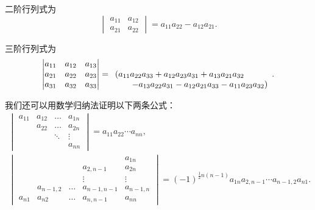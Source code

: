 二阶行列式为
\begin{equation}
	\begin{vmatrix}
		a_{11} & a_{12} \\
		a_{21} & a_{22}
	\end{vmatrix}
	= a_{11} a_{22} - a_{12} a_{21}.
\end{equation}

三阶行列式为
\begin{equation}
	\begin{vmatrix}
		a_{11} & a_{12} & a_{13} \\
		a_{21} & a_{22} & a_{23} \\
		a_{31} & a_{32} & a_{33}
	\end{vmatrix}
	= \begin{array}[t]{l}
		(a_{11} a_{22} a_{33} + a_{12} a_{23} a_{31} + a_{13} a_{21} a_{32} \\
		\hspace{20pt}
		- a_{13} a_{22} a_{31} - a_{12} a_{21} a_{33} - a_{11} a_{23} a_{32})
	\end{array}.
\end{equation}

我们还可以用数学归纳法证明以下两条公式：
\begin{gather}
	\begin{vmatrix}
		a_{11} & a_{12} & \dots & a_{1n} \\
		& a_{22} & \dots & a_{2n} \\
		& & \ddots & \vdots \\
		& & & a_{nn}
	\end{vmatrix}
	= a_{11} a_{22} \dotsm a_{nn}, \\%
	\begin{vmatrix}
		& & & & a_{1n} \\
		& & & a_{2,n-1} & a_{2n} \\
		& & & \vdots & \vdots \\
		& a_{n-1,2} & \dots & a_{n-1,n-1} & a_{n-1,n} \\
		a_{n1} & a_{n2} & \dots & a_{n,n-1} & a_{nn}
	\end{vmatrix}
	=(-1)^{\frac{1}{2}n(n-1)} a_{1n} a_{2,n-1} \dotsm a_{n-1,2} a_{n1}.
\end{gather}

